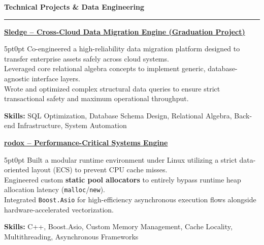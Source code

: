 \documentclass[9pt]{extarticle}
\begin{document}
\par\vspace{5pt}

{\large\bfseries Technical Projects \& Data Engineering}
\par\vspace{-8pt}
\rule{\linewidth}{0.4pt}
\par\vspace{5pt}

\underline{\bfseries Sledge -- Cross-Cloud Data Migration Engine (Graduation Project)}
\par
\begin{adjustwidth}{5pt}{0pt}
    Co-engineered a high-reliability data migration platform designed to transfer enterprise assets safely across cloud systems. \\
    Leveraged core relational algebra concepts to implement generic, database-agnostic interface layers. \\
    Wrote and optimized complex structural data queries to ensure strict transactional safety and maximum operational throughput.
\end{adjustwidth}
\par
{\bfseries Skills:} SQL Optimization, Database Schema Design, Relational Algebra, Back-end Infrastructure, System Automation

\par\vspace{8pt}

\underline{\bfseries rodox -- Performance-Critical Systems Engine}
\par
\begin{adjustwidth}{5pt}{0pt}
    Built a modular runtime environment under Linux utilizing a strict data-oriented layout (ECS) to prevent CPU cache misses. \\
    Engineered custom {\bfseries static pool allocators} to entirely bypass runtime heap allocation latency (\texttt{malloc}/\texttt{new}). \\
    Integrated \texttt{Boost.Asio} for high-efficiency asynchronous execution flows alongside hardware-accelerated vectorization.
\end{adjustwidth}
\par
{\bfseries Skills:} C++, Boost.Asio, Custom Memory Management, Cache Locality, Multithreading, Asynchronous Frameworks

\par\vspace{8pt}
\end{document}
